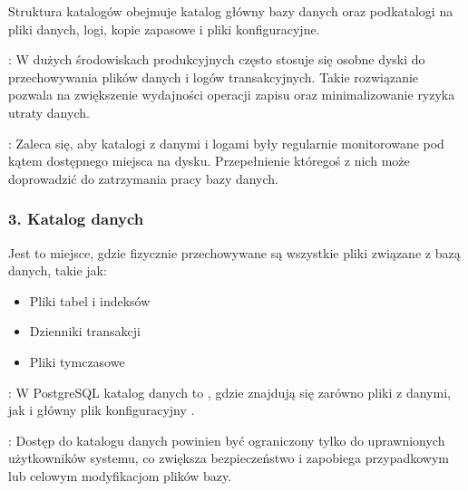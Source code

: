 \documentclass[letterpaper,10pt,polish]{sphinxmanual}
\begin{document}
\sphinxAtStartPar
Struktura katalogów obejmuje katalog główny bazy danych oraz podkatalogi na pliki danych, logi, kopie zapasowe i pliki konfiguracyjne.

\sphinxAtStartPar
{}: W dużych środowiskach produkcyjnych często stosuje się osobne dyski do przechowywania plików danych i logów transakcyjnych. Takie rozwiązanie pozwala na zwiększenie wydajności operacji zapisu oraz minimalizowanie ryzyka utraty danych.

\sphinxAtStartPar
{}: Zaleca się, aby katalogi z danymi i logami były regularnie monitorowane pod kątem dostępnego miejsca na dysku. Przepełnienie któregoś z nich może doprowadzić do zatrzymania pracy bazy danych.


\subsubsection{3. Katalog danych}
\label{\detokenize{rozdzial2/Konfiguracja_baz_danych/Konfiguracja_baz_danych:katalog-danych}}
\sphinxAtStartPar
Jest to miejsce, gdzie fizycznie przechowywane są wszystkie pliki związane z bazą danych, takie jak:
\begin{itemize}
\item {} 
\sphinxAtStartPar
Pliki tabel i indeksów

\item {} 
\sphinxAtStartPar
Dzienniki transakcji

\item {} 
\sphinxAtStartPar
Pliki tymczasowe

\end{itemize}

\sphinxAtStartPar
{}: W PostgreSQL katalog danych to , gdzie znajdują się zarówno pliki z danymi, jak i główny plik konfiguracyjny .

\sphinxAtStartPar
{}: Dostęp do katalogu danych powinien być ograniczony tylko do uprawnionych użytkowników systemu, co zwiększa bezpieczeństwo i zapobiega przypadkowym lub celowym modyfikacjom plików bazy.
\end{document}
